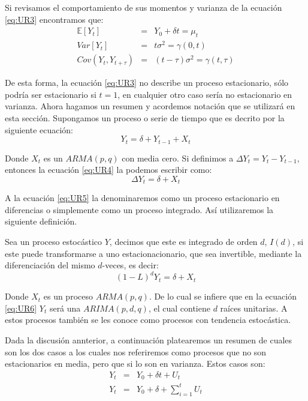 \documentclass[
]{book}
\begin{document}
Si revisamos el comportamiento de sus momentos y varianza de la ecuación \eqref{eq:UR3} encontramos que:
\begin{eqnarray*}
    \mathbb{E}[Y_t] & = & Y_0 + \delta t = \mu_t \\
    Var[Y_t] & = & t \sigma^2 = \gamma(0, t) \\
    Cov(Y_t, Y_{t+\tau}) & = & (t - \tau) \sigma^2 = \gamma(t, \tau)
\end{eqnarray*}

De esta forma, la ecuación \eqref{eq:UR3} no describe un proceso estacionario, sólo podría ser estacionario si \(t = 1\), en cualquier otro caso sería no estacionario en varianza. Ahora hagamos un resumen y acordemos notación que se utilizará en esta sección. Supongamos un proceso o serie de tiempo que es decrito por la siguiente ecuación:
\begin{equation}
    Y_t = \delta + Y_{t-1} + X_t
    \label{eq:UR4}
\end{equation}

Donde \(X_t\) es un \(ARMA(p, q)\) con media cero. Si definimos a \(\Delta Y_t = Y_t - Y_{t-1}\), entonces la ecuación \eqref{eq:UR4} la podemos escribir como:
\begin{equation}
    \Delta Y_t = \delta + X_t
    \label{eq:UR5}
\end{equation}

A la ecuación \eqref{eq:UR5} la denominaremos como un proceso estacionario en diferencias o simplemente como un proceso integrado. Así utilizaremos la siguiente definición.

Sea un proceso estocástico \(Y\), decimos que este es integrado de orden \(d\), \(I(d)\), si este puede transformarse a uno estacionacionario, que sea invertible, mediante la diferenciación del mismo \(d\)-veces, es decir:
\begin{equation}
    (1 - L)^d Y_t = \delta + X_t
    \label{eq:UR6}
\end{equation}

Donde \(X_t\) es un proceso \(ARMA(p, q)\). De lo cual se infiere que en la ecuación \eqref{eq:UR6} \(Y_t\) será una \(ARIMA(p, d, q)\), el cual contiene \(d\) raíces unitarias. A estos procesos también se les conoce como procesos con tendencia estocástica.

Dada la discusión annterior, a continuación platearemos un resumen de cuales son los dos casos a los cuales nos referiremos como procesos que no son estacionarios en media, pero que si lo son en varianza. Estos casos son:
\begin{eqnarray}
    Y_t & = & Y_0 + \delta t + U_t \\
    Y_t & = & Y_0 + \delta + \sum_{i = 1}^t U_t
\end{eqnarray}
\end{document}
